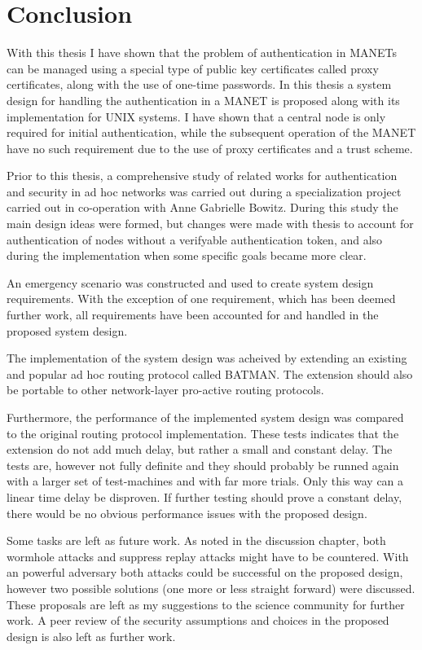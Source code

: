 \chapter{Conclusion}
\label{ch:conclusion}
\acresetall

With this thesis I have shown that the problem of authentication in \aclp{MANET}
can be managed using a special type of public key certificates called proxy
certificates, along with the use of one-time passwords. In this thesis a system
design for handling the authentication in a MANET is proposed along with its
implementation for UNIX systems. I have shown that a central node is only
required for initial authentication, while the subsequent operation of the MANET
have no such requirement due to the use of proxy certificates and a trust
scheme.

Prior to this thesis, a comprehensive study of related works for authentication
and security in ad hoc networks was carried out during a specialization project
carried out in co-operation with Anne Gabrielle Bowitz. During this study the
main design ideas were formed, but changes were made with thesis to account for
authentication of nodes without a verifyable authentication token, and also
during the implementation when some specific goals became more clear.

An emergency scenario was constructed and used to create system design
requirements. With the exception of one requirement, which has been deemed
further work, all requirements have been accounted for and handled in the
proposed system design.

The implementation of the system design was acheived by extending an existing
and popular ad hoc routing protocol called BATMAN. The extension should also be
portable to other network-layer pro-active routing protocols.

Furthermore, the performance of the implemented system design was compared
to the original routing protocol implementation. These tests indicates that the
extension do not add much delay, but rather a small and constant delay. The
tests are, however not fully definite and they should probably be runned again
with a larger set of test-machines and with far more trials. Only this way can a
linear time delay be disproven. If further testing should prove a constant
delay, there would be no obvious performance issues with the proposed design.

Some tasks are left as future work. As noted in the discussion chapter, both
wormhole attacks and suppress replay attacks might have to be countered. With an
powerful adversary both attacks could be successful on the proposed design,
however two possible solutions (one more or less straight forward) were
discussed. These proposals are left as my suggestions to the science community
for further work. A peer review of the security assumptions and choices in the
proposed design is also left as further work.

